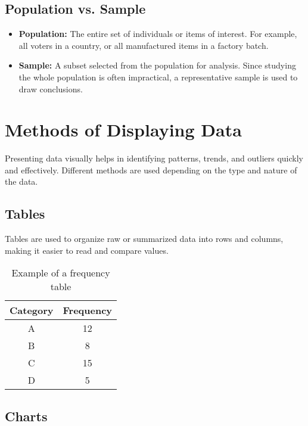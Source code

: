 \subsection{Population vs. Sample}

\begin{itemize}
    \item \textbf{Population:} The entire set of individuals or items of interest. For example, all voters in a country, or all manufactured items in a factory batch.

    \item \textbf{Sample:} A subset selected from the population for analysis. Since studying the whole population is often impractical, a representative sample is used to draw conclusions.
\end{itemize}

\section{Methods of Displaying Data}

Presenting data visually helps in identifying patterns, trends, and outliers quickly and effectively. Different methods are used depending on the type and nature of the data.

\subsection{Tables}

Tables are used to organize raw or summarized data into rows and columns, making it easier to read and compare values.

\begin{table}[h!]
\centering
\begin{tabular}{|c|c|}
\hline
\textbf{Category} & \textbf{Frequency} \\
\hline
A & 12 \\
B & 8 \\
C & 15 \\
D & 5 \\
\hline
\end{tabular}
\caption{Example of a frequency table}
\end{table}

\subsection{Charts}

